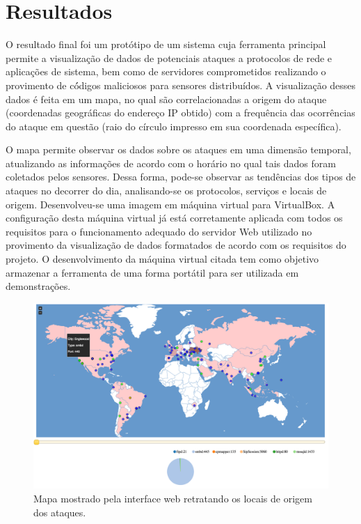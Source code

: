 \documentclass[Portuguese]
{ic-tese-v2}
\begin{document}
\chapter{Resultados}
O resultado final foi um protótipo de um sistema cuja ferramenta principal permite a visualização de dados de potenciais ataques a protocolos de rede e aplicações de sistema, bem como de servidores comprometidos realizando o provimento de có́digos maliciosos para sensores distribuídos. A visualização desses dados é feita em um mapa, no qual são correlacionadas a origem do ataque (coordenadas geográficas do endereço IP obtido) com a frequência das ocorrências do ataque em questão (raio do círculo impresso em sua coordenada específica).

O mapa permite observar os dados sobre os ataques em uma dimensão temporal, atualizando as informações de acordo com o horário no qual tais dados foram coletados pelos sensores. Dessa forma, pode-se observar as tendências dos tipos de ataques no decorrer do dia, analisando-se os protocolos, serviços e locais de origem.
Desenvolveu-se uma imagem em máquina virtual para VirtualBox. A configuração desta máquina virtual já está corretamente aplicada com todos os requisitos para o funcionamento adequado do servidor Web utilizado no provimento da visualização de dados formatados de acordo com os requisitos do projeto. O desenvolvimento da máquina virtual citada tem como objetivo armazenar a ferramenta de uma forma portátil para ser utilizada em demonstrações. 

\begin{figure}
\center
\includegraphics[width=1\textwidth]{figs/mapa.png}
\caption{Mapa mostrado pela interface web retratando os locais de origem dos ataques.}
\label{fig:mapa}
\end{figure}
\end{document}
